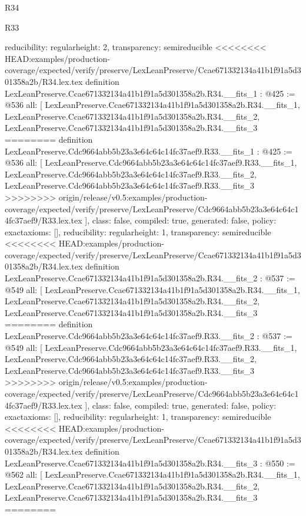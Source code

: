 \begin{lexlean}{R34}
\begin{lexlean}{R33}
\begin{coremodule}
{{{{{{{{{  reducibility: regular{height: 2},
  transparency: semireducible
}
<<<<<<<< HEAD:examples/production-coverage/expected/verify/preserve/LexLeanPreserve/Ccae671332134a41b1f91a5d301358a2b/R34.lex.tex
definition LexLeanPreserve.Ccae671332134a41b1f91a5d301358a2b.R34.__fits_1 : @425 := @536 {
  all: [
    LexLeanPreserve.Ccae671332134a41b1f91a5d301358a2b.R34.__fits_1,
    LexLeanPreserve.Ccae671332134a41b1f91a5d301358a2b.R34.__fits_2,
    LexLeanPreserve.Ccae671332134a41b1f91a5d301358a2b.R34.__fits_3
========
definition LexLeanPreserve.Cdc9664abb5b23a3e64c64c14fc37aef9.R33.__fits_1 : @425 := @536 {
  all: [
    LexLeanPreserve.Cdc9664abb5b23a3e64c64c14fc37aef9.R33.__fits_1,
    LexLeanPreserve.Cdc9664abb5b23a3e64c64c14fc37aef9.R33.__fits_2,
    LexLeanPreserve.Cdc9664abb5b23a3e64c64c14fc37aef9.R33.__fits_3
>>>>>>>> origin/release/v0.5:examples/production-coverage/expected/verify/preserve/LexLeanPreserve/Cdc9664abb5b23a3e64c64c14fc37aef9/R33.lex.tex
  ],
  class: false,
  compiled: true,
  generated: false,
  policy: exact{axioms: []},
  reducibility: regular{height: 1},
  transparency: semireducible
}
<<<<<<<< HEAD:examples/production-coverage/expected/verify/preserve/LexLeanPreserve/Ccae671332134a41b1f91a5d301358a2b/R34.lex.tex
definition LexLeanPreserve.Ccae671332134a41b1f91a5d301358a2b.R34.__fits_2 : @537 := @549 {
  all: [
    LexLeanPreserve.Ccae671332134a41b1f91a5d301358a2b.R34.__fits_1,
    LexLeanPreserve.Ccae671332134a41b1f91a5d301358a2b.R34.__fits_2,
    LexLeanPreserve.Ccae671332134a41b1f91a5d301358a2b.R34.__fits_3
========
definition LexLeanPreserve.Cdc9664abb5b23a3e64c64c14fc37aef9.R33.__fits_2 : @537 := @549 {
  all: [
    LexLeanPreserve.Cdc9664abb5b23a3e64c64c14fc37aef9.R33.__fits_1,
    LexLeanPreserve.Cdc9664abb5b23a3e64c64c14fc37aef9.R33.__fits_2,
    LexLeanPreserve.Cdc9664abb5b23a3e64c64c14fc37aef9.R33.__fits_3
>>>>>>>> origin/release/v0.5:examples/production-coverage/expected/verify/preserve/LexLeanPreserve/Cdc9664abb5b23a3e64c64c14fc37aef9/R33.lex.tex
  ],
  class: false,
  compiled: true,
  generated: false,
  policy: exact{axioms: []},
  reducibility: regular{height: 1},
  transparency: semireducible
}
<<<<<<<< HEAD:examples/production-coverage/expected/verify/preserve/LexLeanPreserve/Ccae671332134a41b1f91a5d301358a2b/R34.lex.tex
definition LexLeanPreserve.Ccae671332134a41b1f91a5d301358a2b.R34.__fits_3 : @550 := @562 {
  all: [
    LexLeanPreserve.Ccae671332134a41b1f91a5d301358a2b.R34.__fits_1,
    LexLeanPreserve.Ccae671332134a41b1f91a5d301358a2b.R34.__fits_2,
    LexLeanPreserve.Ccae671332134a41b1f91a5d301358a2b.R34.__fits_3
========
}}}}}}}}}}}
\end{coremodule}
\end{lexlean}
\end{lexlean}
